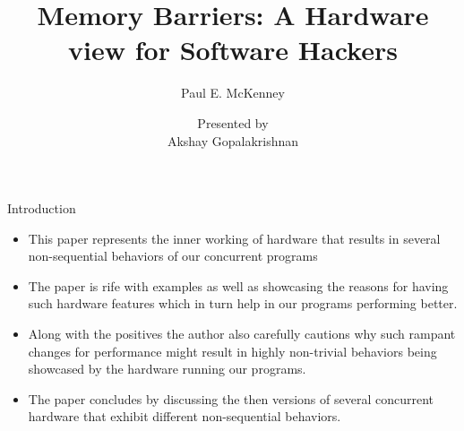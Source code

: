 \documentclass[notes, xcolor = dvipsnames]{beamer}
\title{Memory Barriers: A Hardware view for Software Hackers}
\subtitle{Paul E. McKenney}
\author{Presented by \\ Akshay Gopalakrishnan}
\begin{document}
  
    \begin{frame}
        
        \maketitle
    \end{frame}


    \begin{frame}{Introduction}
        
        \begin{itemize}
            \item This paper represents the inner working of hardware that results in several non-sequential behaviors of our concurrent programs
            \item The paper is rife with examples as well as showcasing the reasons for having such hardware features which in turn help in our programs performing better.
            \item Along with the positives the author also carefully cautions why such rampant changes for performance might result in highly non-trivial behaviors being showcased by the hardware running our programs.
            \item The paper concludes by discussing the then versions of several concurrent hardware that exhibit different non-sequential behaviors.
        \end{itemize}

    \end{frame}
\end{document}
